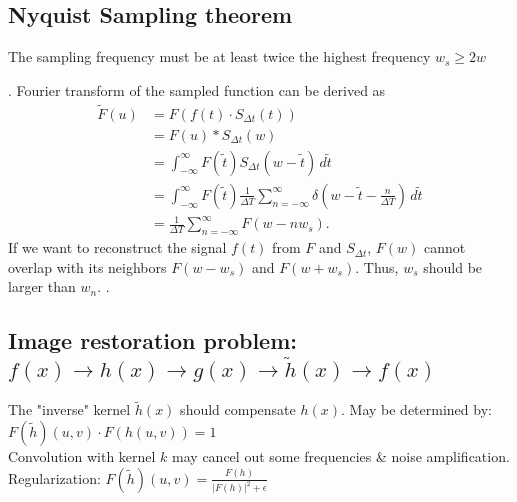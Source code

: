 \subsection*{Nyquist Sampling theorem}
The sampling frequency must be at least twice the highest frequency $w_s \geq 2 w$ 

 . Fourier transform of the sampled function can be derived as
\begin{align*}
    \tilde{F}(u) &= F(f(t) \cdot S_{\Delta t}(t)) \\
                 &= F(u) * S_{\Delta t}(w) \\
                 &= \int_{-\infty}^{\infty} F(\tilde{t}) S_{\Delta t}(w - \tilde{t}) \, d\tilde{t} \\
                 &= \int_{-\infty}^{\infty} F(\tilde{t}) \frac{1}{\Delta T} \sum_{n = -\infty}^{\infty} \delta (w - \tilde{t} - \frac{n}{\Delta T}) \, d\tilde{t} \\
                 &= \frac{1}{\Delta T} \sum_{n = -\infty}^{\infty} F(w - n w_s).
\end{align*}
If we want to reconstruct the signal $f(t)$ from $F$ and $S_{\Delta t}$, $F(w)$ cannot overlap with its neighbors $F(w - w_s)$ and $F(w + w_s)$. Thus, $w_s$ should be larger than $w_n$. .
\subsection*{Image restoration problem: $f(x) \rightarrow h(x) \rightarrow g(x) \rightarrow \tilde{h}(x) \rightarrow f(x)$}
The "inverse" kernel $\tilde{h}(x)$ should compensate $h(x)$. May be determined by: $F(\tilde{h})(u, v) \cdot F(h(u, v)) = 1$\\
 Convolution with kernel $k$ may cancel out some frequencies \& noise amplification. \\
 Regularization: $F(\tilde{h})(u, v) = \frac{F(h)}{{|F(h)|}^{2} + \epsilon}$ 
